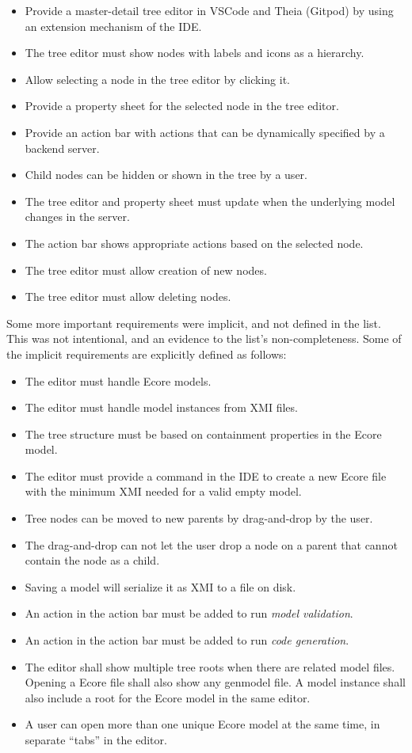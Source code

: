 \begin{itemize}
  \item Provide a master-detail tree editor in VSCode and Theia (Gitpod) by using an extension mechanism of the \gls{IDE}.
  \item The tree editor must show nodes with labels and icons as a hierarchy.
  \item Allow selecting a node in the tree editor by clicking it.
  \item Provide a property sheet for the selected node in the tree editor.
  \item Provide an action bar with actions that can be dynamically specified by a backend server.
  \item Child nodes can be hidden or shown in the tree by a user.
  \item The tree editor and property sheet must update when the underlying model changes in the server.
  \item The action bar shows appropriate actions based on the selected node.
  \item The tree editor must allow creation of new nodes.
  \item The tree editor must allow deleting nodes.
\end{itemize}

Some more important requirements were implicit, and not defined in the list.
This was not intentional, and an evidence to the list's non-completeness.
Some of the implicit requirements are explicitly defined as follows:

\begin{itemize}
  \item The editor must handle \gls{Ecore} models.
  \item The editor must handle model instances from \acrshort{XMI} files.
  \item The tree structure must be based on containment properties in the \gls{Ecore} model.
  \item The editor must provide a command in the \acrshort{IDE} to create a new \gls{Ecore} file with the minimum \acrshort{XMI} needed for a valid empty model.
  \item Tree nodes can be moved to new parents by drag-and-drop by the user.
  \item The drag-and-drop can not let the user drop a node on a parent that cannot contain the node as a child. 
  \item Saving a model will serialize it as \acrshort{XMI} to a file on disk.
  \item An action in the action bar must be added to run \textit{model validation}.
  \item An action in the action bar must be added to run \textit{code generation}.
  \item The editor shall show multiple tree roots when there are related model files. Opening a \gls{Ecore} file shall also show any genmodel file. A model instance shall also include a root for the \gls{Ecore} model in the same editor.
  \item A user can open more than one unique \gls{Ecore} model at the same time, in separate ``tabs'' in the editor.
\end{itemize}


